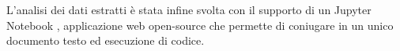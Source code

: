 %

L'analisi dei dati estratti è stata infine svolta con il supporto di un Jupyter Notebook \cite{jupyter}, applicazione web open-source che permette di coniugare in un unico documento testo ed esecuzione di codice. 


